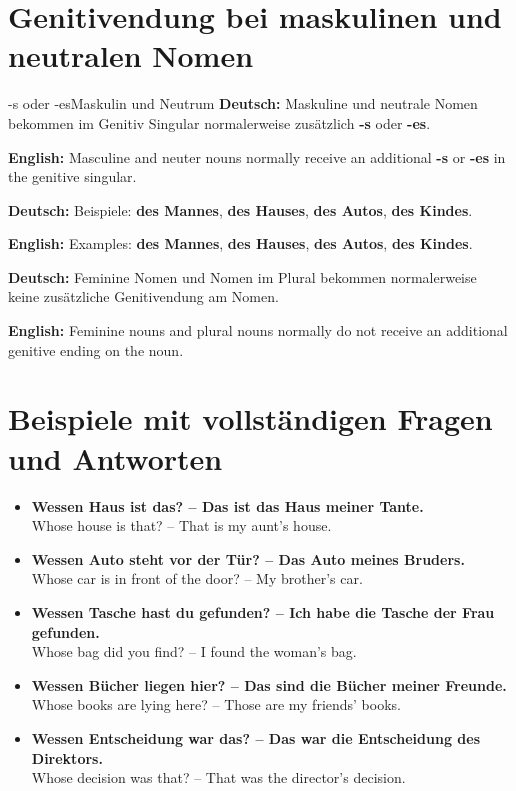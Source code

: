 \documentclass[a4paper,11pt]{article}
\newcommand{\GermanText}[1]{\textbf{Deutsch: }#1\par}
\newcommand{\EnglishText}[1]{{\small\color{SoftGray}\textbf{English: }#1\par}}
\newcommand{\ExampleItem}[2]{\item \textbf{#1}\\{\small\color{SoftGray}#2}}
\begin{document}
    
    \section{Genitivendung bei maskulinen und neutralen Nomen}
        
        \begin{grammarentry}{-s oder -es}{Maskulin und Neutrum}
            \GermanText{Maskuline und neutrale Nomen bekommen im Genitiv Singular normalerweise zusätzlich \textbf{-s} oder \textbf{-es}.}
            \EnglishText{Masculine and neuter nouns normally receive an additional \textbf{-s} or \textbf{-es} in the genitive singular.}
            
            \GermanText{Beispiele: \textbf{des Mannes}, \textbf{des Hauses}, \textbf{des Autos}, \textbf{des Kindes}.}
            \EnglishText{Examples: \textbf{des Mannes}, \textbf{des Hauses}, \textbf{des Autos}, \textbf{des Kindes}.}
            
            \GermanText{Feminine Nomen und Nomen im Plural bekommen normalerweise keine zusätzliche Genitivendung am Nomen.}
            \EnglishText{Feminine nouns and plural nouns normally do not receive an additional genitive ending on the noun.}
        \end{grammarentry}
    
    
    \section{Beispiele mit vollständigen Fragen und Antworten}
        
        \begin{exbox}
            \begin{itemize}
                \ExampleItem{Wessen Haus ist das? -- Das ist das Haus meiner Tante.}{Whose house is that? -- That is my aunt's house.}
                
                \ExampleItem{Wessen Auto steht vor der Tür? -- Das Auto meines Bruders.}{Whose car is in front of the door? -- My brother's car.}
                
                \ExampleItem{Wessen Tasche hast du gefunden? -- Ich habe die Tasche der Frau gefunden.}{Whose bag did you find? -- I found the woman's bag.}
                
                \ExampleItem{Wessen Bücher liegen hier? -- Das sind die Bücher meiner Freunde.}{Whose books are lying here? -- Those are my friends' books.}
                
                \ExampleItem{Wessen Entscheidung war das? -- Das war die Entscheidung des Direktors.}{Whose decision was that? -- That was the director's decision.}
            \end{itemize}
        \end{exbox}
    
\end{document}

